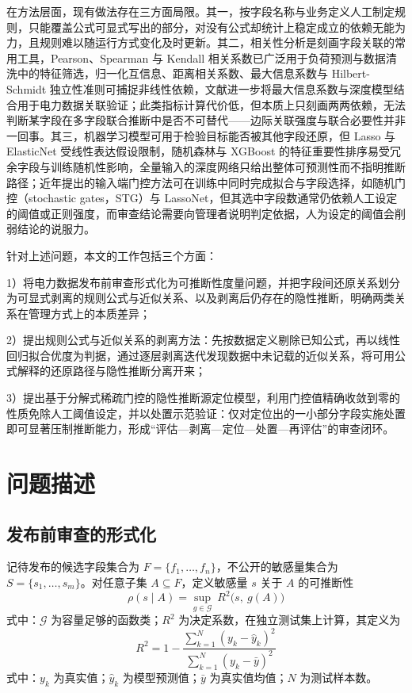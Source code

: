 \documentclass[UTF8,zihao=5,twoside]{ctexart}
\begin{document}
在方法层面，现有做法存在三方面局限。其一，按字段名称与业务定义人工制定规则，只能覆盖公式可显式写出的部分，对没有公式却统计上稳定成立的依赖无能为力，且规则难以随运行方式变化及时更新。其二，相关性分析是刻画字段关联的常用工具，Pearson、Spearman 与 Kendall 相关系数\cite{ref-pearson,ref-spearman,ref-kendall}已广泛用于负荷预测与数据清洗中的特征筛选\cite{ref-lan-load,ref-jiao-pv,ref-deng-load}，归一化互信息\cite{ref-cover-info}、距离相关系数\cite{ref-szekely-dcorr}、最大信息系数\cite{ref-reshef-mic}与 Hilbert-Schmidt 独立性准则\cite{ref-gretton-hsic}可捕捉非线性依赖，文献\cite{ref-xing-micdnn}进一步将最大信息系数与深度模型结合用于电力数据关联验证；此类指标计算代价低，但本质上只刻画两两依赖，无法判断某字段在多字段联合推断中是否不可替代——边际关联强度与联合必要性并非一回事。其三，机器学习模型可用于检验目标能否被其他字段还原\cite{ref-tibshirani-lasso,ref-zou-enet,ref-breiman-rf,ref-chen-xgboost,ref-lecun-deep}，但 Lasso 与 ElasticNet 受线性表达假设限制，随机森林与 XGBoost 的特征重要性排序易受冗余字段与训练随机性影响，全量输入的深度网络只给出整体可预测性而不指明推断路径；近年提出的输入端门控方法可在训练中同时完成拟合与字段选择，如随机门控（stochastic gates，STG）\cite{ref-stg}与 LassoNet\cite{ref-lassonet}，但其选中字段数通常仍依赖人工设定的阈值或正则强度，而审查结论需要向管理者说明判定依据，人为设定的阈值会削弱结论的说服力。

针对上述问题，本文的工作包括三个方面：

1）将电力数据发布前审查形式化为可推断性度量问题，并把字段间还原关系划分为可显式剥离的规则公式与近似关系、以及剥离后仍存在的隐性推断，明确两类关系在管理方式上的本质差异；

2）提出规则公式与近似关系的剥离方法：先按数据定义剔除已知公式，再以线性回归拟合优度为判据，通过逐层剥离迭代发现数据中未记载的近似关系，将可用公式解释的还原路径与隐性推断分离开来；

3）提出基于分解式稀疏门控的隐性推断源定位模型，利用门控值精确收敛到零的性质免除人工阈值设定，并以处置示范验证：仅对定位出的一小部分字段实施处置即可显著压制推断能力，形成“评估—剥离—定位—处置—再评估”的审查闭环。

\section{问题描述}

\subsection{发布前审查的形式化}

记待发布的候选字段集合为 $F=\{f_1,\dots,f_n\}$，不公开的敏感量集合为 $S=\{s_1,\dots,s_m\}$。对任意子集 $A\subseteq F$，定义敏感量 $s$ 关于 $A$ 的可推断性
\begin{equation}
\rho(s\mid A)=\sup_{g\in\mathcal{G}}\ R^2\big(s,\ g(A)\big)
\end{equation}
式中：$\mathcal{G}$ 为容量足够的函数类；$R^2$ 为决定系数，在独立测试集上计算，其定义为
\begin{equation}
R^2=1-\frac{\sum_{k=1}^{N}(y_k-\hat y_k)^2}{\sum_{k=1}^{N}(y_k-\bar y)^2}
\end{equation}
式中：$y_k$ 为真实值；$\hat y_k$ 为模型预测值；$\bar y$ 为真实值均值；$N$ 为测试样本数。
\end{document}
